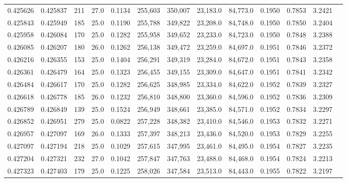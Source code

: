 \begin{tabular}{rrrrrrrrrrrrr}
0.425626 & 0.425837 &   211 & 27.0 &                                     0.1134 & 255,603 & 350,007 &  23,183.0 &  84,773.0 & 0.1950 & 0.7853 & 3.2421 \\
0.425843 & 0.425949 &   185 & 25.0 &                                     0.1190 & 255,788 & 349,822 &  23,208.0 &  84,748.0 & 0.1950 & 0.7850 & 3.2404 \\
0.425958 & 0.426084 &   170 & 25.0 &                                     0.1282 & 255,958 & 349,652 &  23,233.0 &  84,723.0 & 0.1950 & 0.7848 & 3.2388 \\
0.426085 & 0.426207 &   180 & 26.0 &                                     0.1262 & 256,138 & 349,472 &  23,259.0 &  84,697.0 & 0.1951 & 0.7846 & 3.2372 \\
0.426216 & 0.426355 &   153 & 25.0 &                                     0.1404 & 256,291 & 349,319 &  23,284.0 &  84,672.0 & 0.1951 & 0.7843 & 3.2358 \\
0.426361 & 0.426479 &   164 & 25.0 &                                     0.1323 & 256,455 & 349,155 &  23,309.0 &  84,647.0 & 0.1951 & 0.7841 & 3.2342 \\
0.426484 & 0.426617 &   170 & 25.0 &                                     0.1282 & 256,625 & 348,985 &  23,334.0 &  84,622.0 & 0.1952 & 0.7839 & 3.2327 \\
0.426618 & 0.426778 &   185 & 26.0 &                                     0.1232 & 256,810 & 348,800 &  23,360.0 &  84,596.0 & 0.1952 & 0.7836 & 3.2309 \\
0.426789 & 0.426849 &   139 & 25.0 &                                     0.1524 & 256,949 & 348,661 &  23,385.0 &  84,571.0 & 0.1952 & 0.7834 & 3.2297 \\
0.426852 & 0.426951 &   279 & 25.0 &                                     0.0822 & 257,228 & 348,382 &  23,410.0 &  84,546.0 & 0.1953 & 0.7832 & 3.2271 \\
0.426957 & 0.427097 &   169 & 26.0 &                                     0.1333 & 257,397 & 348,213 &  23,436.0 &  84,520.0 & 0.1953 & 0.7829 & 3.2255 \\
0.427097 & 0.427194 &   218 & 25.0 &                                     0.1029 & 257,615 & 347,995 &  23,461.0 &  84,495.0 & 0.1954 & 0.7827 & 3.2235 \\
0.427204 & 0.427321 &   232 & 27.0 &                                     0.1042 & 257,847 & 347,763 &  23,488.0 &  84,468.0 & 0.1954 & 0.7824 & 3.2213 \\
0.427323 & 0.427403 &   179 & 25.0 &                                     0.1225 & 258,026 & 347,584 &  23,513.0 &  84,443.0 & 0.1955 & 0.7822 & 3.2197 \\

\end{tabular}
